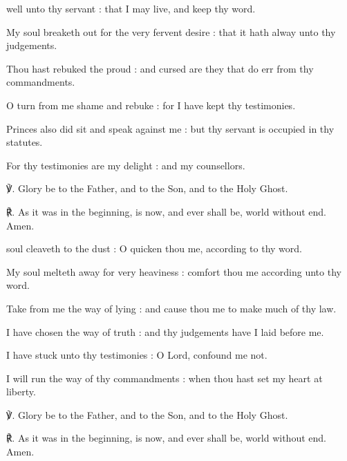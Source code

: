 \vspace{-1.625ex}
 well unto thy servant : that I may live, and keep thy word.\par
{}
My soul breaketh out for the very fervent desire : that it hath alway unto thy judgements.\par
{}Thou hast rebuked the proud : and cursed are they that do err from thy commandments.\par
{}O turn from me shame and rebuke : for I have kept thy testimonies.\par
{}Princes also did sit and speak against me : but thy servant is occupied in thy statutes.\par
{}For thy testimonies are my delight : and my counsellors.\par
℣. Glory be to the Father, and to the Son, and to the Holy Ghost.\par
℟. As it was in the beginning, is now, and ever shall be, world without end. Amen.

 soul cleaveth to the dust : O quicken thou me, according to thy word.\par
{}
My soul melteth away for very heaviness : comfort thou me according unto thy word.\par
{}Take from me the way of lying : and cause thou me to make much of thy law.\par
{}I have chosen the way of truth : and thy judgements have I laid before me.\par
{}I have stuck unto thy testimonies : O Lord, confound me not.\par
{}I will run the way of thy commandments : when thou hast set my heart at liberty.\par
℣. Glory be to the Father, and to the Son, and to the Holy Ghost.\par
℟. As it was in the beginning, is now, and ever shall be, world without end. Amen.

